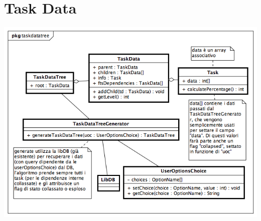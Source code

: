 \documentclass[a4paper, 12pt]{report}
\begin{document}
\section{Task Data}
\includegraphics[width=\textwidth]{chart/TaskDataTree.png}
\end{document}
